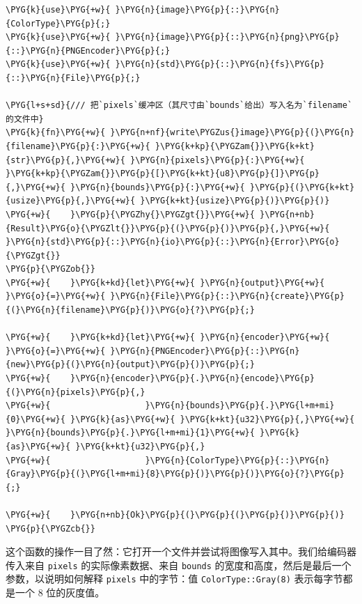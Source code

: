 \begin{Verbatim}[commandchars=\\\{\},breaklines=true,breakanywhere=true,fontsize=\codefont,xleftmargin=17bp]
\PYG{k}{use}\PYG{+w}{ }\PYG{n}{image}\PYG{p}{::}\PYG{n}{ColorType}\PYG{p}{;}
\PYG{k}{use}\PYG{+w}{ }\PYG{n}{image}\PYG{p}{::}\PYG{n}{png}\PYG{p}{::}\PYG{n}{PNGEncoder}\PYG{p}{;}
\PYG{k}{use}\PYG{+w}{ }\PYG{n}{std}\PYG{p}{::}\PYG{n}{fs}\PYG{p}{::}\PYG{n}{File}\PYG{p}{;}

\PYG{l+s+sd}{/// 把`pixels`缓冲区（其尺寸由`bounds`给出）写入名为`filename`的文件中}
\PYG{k}{fn}\PYG{+w}{ }\PYG{n+nf}{write\PYGZus{}image}\PYG{p}{(}\PYG{n}{filename}\PYG{p}{:}\PYG{+w}{ }\PYG{k+kp}{\PYGZam{}}\PYG{k+kt}{str}\PYG{p}{,}\PYG{+w}{ }\PYG{n}{pixels}\PYG{p}{:}\PYG{+w}{ }\PYG{k+kp}{\PYGZam{}}\PYG{p}{[}\PYG{k+kt}{u8}\PYG{p}{]}\PYG{p}{,}\PYG{+w}{ }\PYG{n}{bounds}\PYG{p}{:}\PYG{+w}{ }\PYG{p}{(}\PYG{k+kt}{usize}\PYG{p}{,}\PYG{+w}{ }\PYG{k+kt}{usize}\PYG{p}{)}\PYG{p}{)}
\PYG{+w}{    }\PYG{p}{\PYGZhy{}\PYGZgt{}}\PYG{+w}{ }\PYG{n+nb}{Result}\PYG{o}{\PYGZlt{}}\PYG{p}{(}\PYG{p}{)}\PYG{p}{,}\PYG{+w}{ }\PYG{n}{std}\PYG{p}{::}\PYG{n}{io}\PYG{p}{::}\PYG{n}{Error}\PYG{o}{\PYGZgt{}}
\PYG{p}{\PYGZob{}}
\PYG{+w}{    }\PYG{k+kd}{let}\PYG{+w}{ }\PYG{n}{output}\PYG{+w}{ }\PYG{o}{=}\PYG{+w}{ }\PYG{n}{File}\PYG{p}{::}\PYG{n}{create}\PYG{p}{(}\PYG{n}{filename}\PYG{p}{)}\PYG{o}{?}\PYG{p}{;}

\PYG{+w}{    }\PYG{k+kd}{let}\PYG{+w}{ }\PYG{n}{encoder}\PYG{+w}{ }\PYG{o}{=}\PYG{+w}{ }\PYG{n}{PNGEncoder}\PYG{p}{::}\PYG{n}{new}\PYG{p}{(}\PYG{n}{output}\PYG{p}{)}\PYG{p}{;}
\PYG{+w}{    }\PYG{n}{encoder}\PYG{p}{.}\PYG{n}{encode}\PYG{p}{(}\PYG{n}{pixels}\PYG{p}{,}
\PYG{+w}{                   }\PYG{n}{bounds}\PYG{p}{.}\PYG{l+m+mi}{0}\PYG{+w}{ }\PYG{k}{as}\PYG{+w}{ }\PYG{k+kt}{u32}\PYG{p}{,}\PYG{+w}{ }\PYG{n}{bounds}\PYG{p}{.}\PYG{l+m+mi}{1}\PYG{+w}{ }\PYG{k}{as}\PYG{+w}{ }\PYG{k+kt}{u32}\PYG{p}{,}
\PYG{+w}{                   }\PYG{n}{ColorType}\PYG{p}{::}\PYG{n}{Gray}\PYG{p}{(}\PYG{l+m+mi}{8}\PYG{p}{)}\PYG{p}{)}\PYG{o}{?}\PYG{p}{;}

\PYG{+w}{    }\PYG{n+nb}{Ok}\PYG{p}{(}\PYG{p}{(}\PYG{p}{)}\PYG{p}{)}
\PYG{p}{\PYGZcb{}}
\end{Verbatim}

这个函数的操作一目了然：它打开一个文件并尝试将图像写入其中。我们给编码器传入来自 \texttt{pixels} 的实际像素数据、来自 \texttt{bounds} 的宽度和高度，然后是最后一个参数，以说明如何解释 \texttt{pixels} 中的字节：值 \texttt{ColorType::Gray(8)} 表示每字节都是一个 8 位的灰度值。

